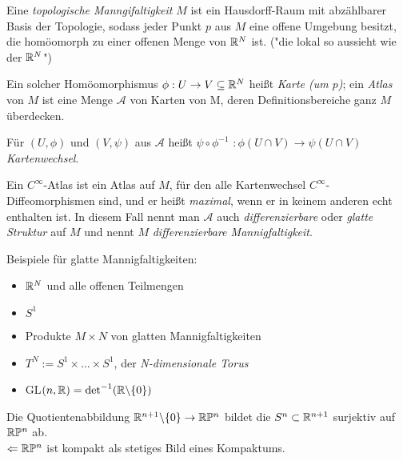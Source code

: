 \begin{defi}
Eine \emph{topologische Manngifaltigkeit} $M$ ist ein Hausdorff-Raum mit abzählbarer Basis der Topologie, sodass jeder Punkt $p$ aus $M$ eine offene Umgebung besitzt, die homöomorph zu einer offenen Menge von $\mathbb R^N$ ist. ("die lokal so aussieht wie der $\mathbb R^N$")
\end{defi}

\begin{defi}
Ein solcher Homöomorphismus $\phi: U \to V \subseteq \mathbb R^N$ heißt \emph{Karte (um $p$)}; ein \emph{Atlas} von $M$ ist eine Menge $\mathcal{A}$ von Karten von M, deren Definitionsbereiche ganz $M$ überdecken.
\end{defi}

\begin{defi}[Kartenwechsel]
Für $(U, \phi)$ und $(V, \psi)$ aus $\mathcal{A}$ heißt \underline{$\psi \circ \phi^{-1}$} $: \phi(U \cap V) \to \psi(U \cap V)$ \emph{Kartenwechsel}.
\end{defi}

\begin{defi}
Ein $C^{\infty}$-Atlas ist ein Atlas auf $M$, für den alle Kartenwechsel $C^{\infty}$-Diffeo\-morphismen sind, und er heißt \emph{maximal}, wenn er in keinem anderen echt enthalten ist.
In diesem Fall nennt man $\mathcal{A}$ auch \emph{differenzierbare} oder \emph{glatte Struktur} auf $M$ und nennt $M$ \emph{differenzierbare Mannigfaltigkeit}.
\end{defi}

\begin{bsp} Beispiele für glatte Mannigfaltigkeiten:
\begin{itemize}
	\item $\mathbb R^N$ und alle offenen Teilmengen
	\item $S^1$
	\item Produkte $M \times N$ von glatten Mannigfaltigkeiten
	\item $T^N := S^1 \times \dots \times S^1$, der \emph{N-dimensionale Torus}
	\item GL$(n, \mathbb R) = \det^{-1}(\mathbb R \backslash \{0\})$
\end{itemize}	
\end{bsp}

\begin{bsp}
	Die Quotientenabbildung $\mathbb R^{n+1}\backslash\{0\} \to \mathbb R \mathbb{P}^n$
	bildet die $S^n\subset \mathbb R^{n+1}$ surjektiv auf $\mathbb R \mathbb{P}^n$ ab.\\
	$\Leftarrow\mathbb R \mathbb{P}^n$ ist kompakt als stetiges Bild eines Kompaktums.
\end{bsp}
